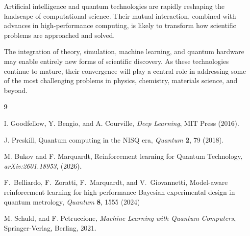 \documentclass[11pt]{article}
\begin{document}
Artificial intelligence and quantum technologies are rapidly reshaping
the landscape of computational science. Their mutual interaction,
combined with advances in high-performance computing, is likely to
transform how scientific problems are approached and solved.

The integration of theory, simulation, machine learning, and quantum
hardware may enable entirely new forms of scientific discovery. As
these technologies continue to mature, their convergence will play a
central role in addressing some of the most challenging problems in
physics, chemistry, materials science, and beyond.

\begin{thebibliography}{9}

I. Goodfellow, Y. Bengio, and A. Courville,
\textit{Deep Learning},
MIT Press (2016).

J. Preskill,
Quantum computing in the NISQ era,
\textit{Quantum} \textbf{2}, 79 (2018).

M. Bukov and F. Marquardt,
Reinforcement learning for Quantum Technology, \textit{arXiv:2601.18953}, (2026).

F.~Belliardo, F.~Zoratti, F.~Marquardt, and
V.~Giovannetti, Model-aware reinforcement learning for
high-performance Bayesian experimental design in quantum metrology,
\textit{Quantum} \textbf{8}, 1555 (2024)



M. Schuld, and F. Petruccione,
\textit{Machine Learning with Quantum Computers}, Springer-Verlag, Berling, 2021.


\end{thebibliography}
\end{document}
